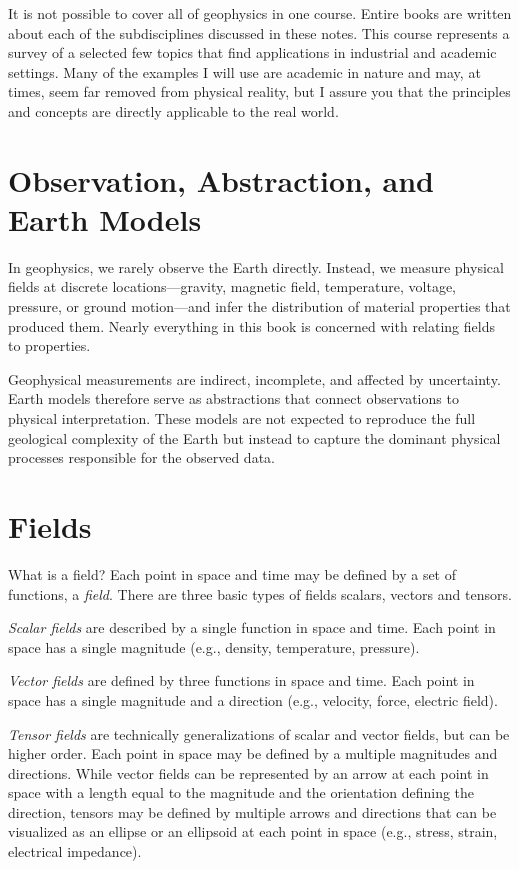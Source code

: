 It is not possible to cover all of geophysics in one course.  Entire books are written about each of the subdisciplines discussed in these notes.  This course represents a survey of a selected few topics that find applications in industrial and academic settings.  Many of the examples I will use are academic in nature and may, at times, seem far removed from physical reality, but I assure you that the principles and concepts are directly applicable to the real world.

\section{Observation, Abstraction, and Earth Models}

In geophysics, we rarely observe the Earth directly. Instead, we measure physical fields at discrete locations—gravity, magnetic field, temperature, voltage, pressure, or ground motion—and infer the distribution of material properties that produced them. Nearly everything in this book is concerned with relating fields to properties.

Geophysical measurements are indirect, incomplete, and affected by uncertainty. Earth models therefore serve as abstractions that connect observations to physical interpretation. These models are not expected to reproduce the full geological complexity of the Earth but instead to capture the dominant physical processes responsible for the observed data.

\section{Fields}

What is a field?  Each point in space and time may be defined by a set of functions, a {\it field}.  There are three basic types of fields scalars, vectors and tensors.

\emph{Scalar fields} are described by a single function in space and time.  Each point in space has a single magnitude (e.g., density, temperature, pressure).

\emph{Vector fields} are defined by three functions in space and time.  Each point in space has a single magnitude and a direction (e.g., velocity, force, electric field).

\emph{Tensor fields} are technically generalizations of scalar and vector fields, but can be higher order.  Each point in space may be defined by a multiple magnitudes and directions.  While vector fields can be represented by an arrow at each point in space with a length equal to the magnitude and the orientation defining the direction, tensors may be defined by multiple arrows and directions that can be visualized as an ellipse or an ellipsoid at each point in space (e.g., stress, strain, electrical impedance).

